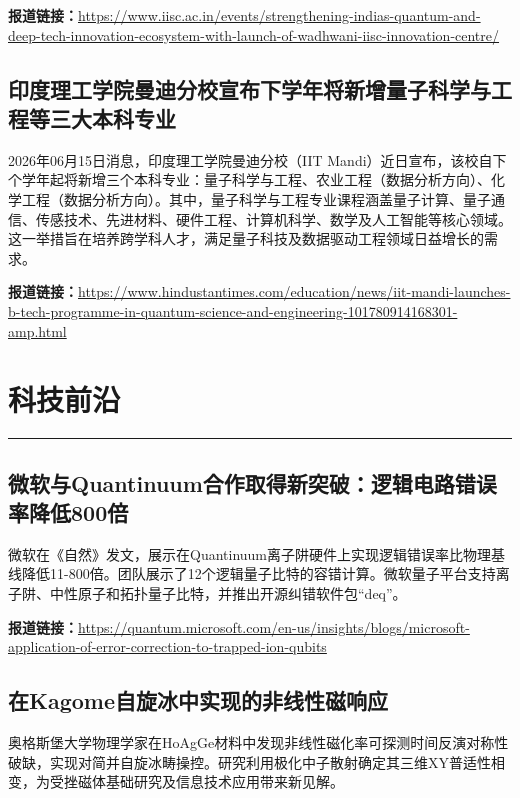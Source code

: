 \documentclass[12pt,a4paper]{ctexart}
\begin{document}
\noindent\textbf{报道链接：}\url{https://www.iisc.ac.in/events/strengthening-indias-quantum-and-deep-tech-innovation-ecosystem-with-launch-of-wadhwani-iisc-innovation-centre/}

\subsection{ 印度理工学院曼迪分校宣布下学年将新增量子科学与工程等三大本科专业 }

2026年06月15日消息，印度理工学院曼迪分校（IIT Mandi）近日宣布，该校自下个学年起将新增三个本科专业：量子科学与工程、农业工程（数据分析方向）、化学工程（数据分析方向）。其中，量子科学与工程专业课程涵盖量子计算、量子通信、传感技术、先进材料、硬件工程、计算机科学、数学及人工智能等核心领域。这一举措旨在培养跨学科人才，满足量子科技及数据驱动工程领域日益增长的需求。

\noindent\textbf{报道链接：}\url{https://www.hindustantimes.com/education/news/iit-mandi-launches-b-tech-programme-in-quantum-science-and-engineering-101780914168301-amp.html}


\newpage
\section{科技前沿}
\vspace{-0.5em}
\noindent\rule{\linewidth}{1.5pt}

\subsection{ 微软与Quantinuum合作取得新突破：逻辑电路错误率降低800倍 }

微软在《自然》发文，展示在Quantinuum离子阱硬件上实现逻辑错误率比物理基线降低11-800倍。团队展示了12个逻辑量子比特的容错计算。微软量子平台支持离子阱、中性原子和拓扑量子比特，并推出开源纠错软件包“deq”。

\noindent\textbf{报道链接：}\url{https://quantum.microsoft.com/en-us/insights/blogs/microsoft-application-of-error-correction-to-trapped-ion-qubits}

\subsection{ 在Kagome自旋冰中实现的非线性磁响应 }

奥格斯堡大学物理学家在HoAgGe材料中发现非线性磁化率可探测时间反演对称性破缺，实现对简并自旋冰畴操控。研究利用极化中子散射确定其三维XY普适性相变，为受挫磁体基础研究及信息技术应用带来新见解。
\end{document}
